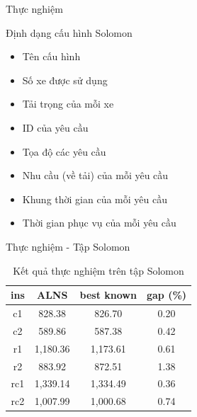 \begin{frame}{Thực nghiệm}
  \begin{block}{Định dạng cấu hình Solomon}
    \begin{itemize}
      \item Tên cấu hình
      \item Số xe được sử dụng
      \item Tải trọng của mỗi xe
      \item ID của yêu cầu
      \item Tọa độ các yêu cầu
      \item Nhu cầu (về tải) của mỗi yêu cầu
      \item Khung thời gian của mỗi yêu cầu
      \item Thời gian phục vụ của mỗi yêu cầu
    \end{itemize}
  \end{block}
\end{frame}

\begin{frame}{Thực nghiệm - Tập Solomon}
  \begin{table}
    \begin{tabular}{|c|c|c|c|}
      \hline
      ins & ALNS & best known & gap (\%) \\ \hline
      c1 & 828.38 & 826.70 & 0.20 \\ \hline
      c2 & 589.86 & 587.38 & 0.42 \\ \hline
      r1 & 1,180.36 & 1,173.61 & 0.61 \\ \hline
      r2 & 883.92 & 872.51 & 1.38 \\ \hline
      rc1 & 1,339.14 & 1,334.49 & 0.36 \\ \hline
      rc2 & 1,007.99 & 1,000.68 & 0.74 \\ \hline
    \end{tabular}
    \caption{Kết quả thực nghiệm trên tập Solomon}
  \end{table}
\end{frame}

